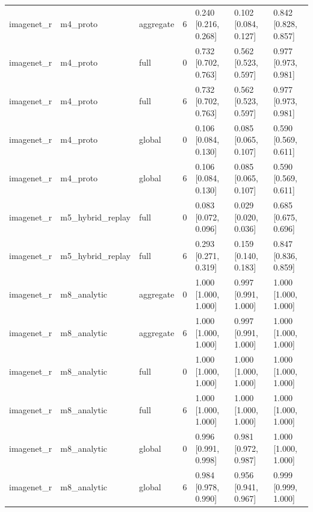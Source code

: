 \begin{tabular}{lllrlll}
imagenet\_r & m4\_proto & aggregate & 6 & 0.240 [0.216, 0.268] & 0.102 [0.084, 0.127] & 0.842 [0.828, 0.857] \\
imagenet\_r & m4\_proto & full & 0 & 0.732 [0.702, 0.763] & 0.562 [0.523, 0.597] & 0.977 [0.973, 0.981] \\
imagenet\_r & m4\_proto & full & 6 & 0.732 [0.702, 0.763] & 0.562 [0.523, 0.597] & 0.977 [0.973, 0.981] \\
imagenet\_r & m4\_proto & global & 0 & 0.106 [0.084, 0.130] & 0.085 [0.065, 0.107] & 0.590 [0.569, 0.611] \\
imagenet\_r & m4\_proto & global & 6 & 0.106 [0.084, 0.130] & 0.085 [0.065, 0.107] & 0.590 [0.569, 0.611] \\
imagenet\_r & m5\_hybrid\_replay & full & 0 & 0.083 [0.072, 0.096] & 0.029 [0.020, 0.036] & 0.685 [0.675, 0.696] \\
imagenet\_r & m5\_hybrid\_replay & full & 6 & 0.293 [0.271, 0.319] & 0.159 [0.140, 0.183] & 0.847 [0.836, 0.859] \\
imagenet\_r & m8\_analytic & aggregate & 0 & 1.000 [1.000, 1.000] & 0.997 [0.991, 1.000] & 1.000 [1.000, 1.000] \\
imagenet\_r & m8\_analytic & aggregate & 6 & 1.000 [1.000, 1.000] & 0.997 [0.991, 1.000] & 1.000 [1.000, 1.000] \\
imagenet\_r & m8\_analytic & full & 0 & 1.000 [1.000, 1.000] & 1.000 [1.000, 1.000] & 1.000 [1.000, 1.000] \\
imagenet\_r & m8\_analytic & full & 6 & 1.000 [1.000, 1.000] & 1.000 [1.000, 1.000] & 1.000 [1.000, 1.000] \\
imagenet\_r & m8\_analytic & global & 0 & 0.996 [0.991, 0.998] & 0.981 [0.972, 0.987] & 1.000 [1.000, 1.000] \\
imagenet\_r & m8\_analytic & global & 6 & 0.984 [0.978, 0.990] & 0.956 [0.941, 0.967] & 0.999 [0.999, 1.000] \\
\bottomrule
\end{tabular}
